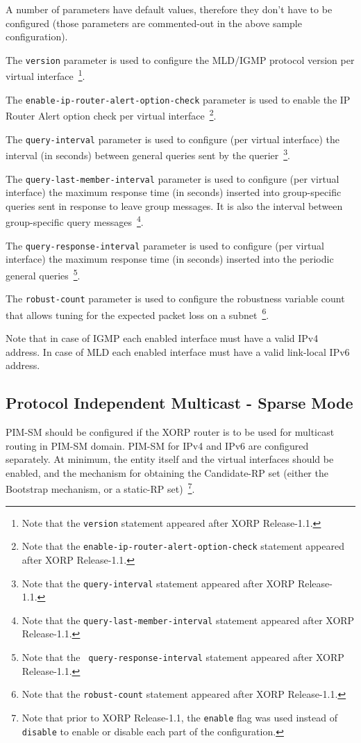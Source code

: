 A number of parameters have default values, therefore
they don't have to be configured (those parameters are commented-out
in the above sample configuration).

The {\tt version} parameter is used to configure the MLD/IGMP protocol
version per virtual interface~\footnote{Note that the {\tt version}
statement appeared after XORP Release-1.1.}.

The {\tt enable-ip-router-alert-option-check} parameter is used to
enable the IP Router Alert option check per virtual interface~\footnote{Note
that the {\tt enable-ip-router-alert-option-check} statement appeared after
XORP Release-1.1.}.

The {\tt query-interval} parameter is used to configure (per virtual
interface) the interval (in seconds) between general queries sent by the
querier~\footnote{Note that the {\tt query-interval} statement appeared
after XORP Release-1.1.}.

The {\tt query-last-member-interval} parameter is used to configure (per
virtual interface) the maximum response time (in seconds) inserted into
group-specific queries sent in response to leave group messages. It is
also the interval between group-specific query messages~\footnote{Note
that the {\tt query-last-member-interval} statement appeared after XORP
Release-1.1.}.

The {\tt query-response-interval} parameter is used to configure (per
virtual interface) the maximum response time (in seconds) inserted into
the periodic general queries~\footnote{Note that the {\tt
query-response-interval} statement appeared after XORP Release-1.1.}.

The {\tt robust-count} parameter is used to configure the robustness
variable count that allows tuning for the expected packet loss on a
subnet~\footnote{Note that the {\tt robust-count} statement appeared
after XORP Release-1.1.}.

Note that in case of IGMP each enabled interface must have a valid IPv4
address. In case of MLD each enabled interface must have a valid
link-local IPv6 address.

\newpage
\subsection{Protocol Independent Multicast - Sparse Mode}
\label{sec:protocols:pim}

PIM-SM should be configured if the XORP router is to be used for
multicast routing in PIM-SM domain. PIM-SM for IPv4 and IPv6 are
configured separately. At minimum, the entity itself and the
virtual interfaces should be enabled, and the mechanism for obtaining
the Candidate-RP set (either the Bootstrap mechanism, or a static-RP
set)~\footnote{Note that prior to XORP Release-1.1, the {\tt enable} flag
was used instead of {\tt disable} to enable or disable each part of the
configuration.}.

